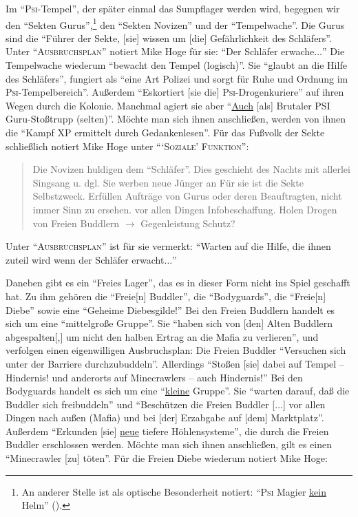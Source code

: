 \documentclass[a5paper,pagesize,numbers=noenddot]{scrbook}
\begin{document}
Im \enquote{\textsc{Psi}-Tempel}, der später einmal das Sumpflager werden wird, begegnen wir den \enquote{Sekten Gurus},\footnote{An anderer Stelle ist als optische Besonderheit notiert: \enquote{\textsc{Psi} Magier \uline{kein} Helm} (\autocite[S.~7]{orpheus_b_scribbles}).} den \enquote{Sekten Novizen} und der \enquote{Tempelwache}.
Die Gurus sind die \enquote{Führer der Sekte, [sie] wissen um [die] Gefährlichkeit des Schläfers}.
Unter \enquote{\textsc{Ausbruchsplan}} notiert Mike Hoge für sie: \enquote{Der Schläfer erwache$\ldots$}
Die Tempelwache wiederum \enquote{bewacht den Tempel (logisch)}.
Sie \enquote{glaubt an die Hilfe des Schläfers}, fungiert als \enquote{eine Art Polizei und sorgt für Ruhe und Ordnung im \textsc{Psi}-Tempelbereich}.
Außerdem \enquote{Eskortiert [sie die] \textsc{Psi}-Drogenkuriere} auf ihren Wegen durch die Kolonie.
Manchmal agiert sie aber \enquote{\uline{Auch} [als] Brutaler \textsc{PSI} Guru-Stoßtrupp (selten)}.
Möchte man sich ihnen anschließen, werden von ihnen die \enquote{Kampf XP ermittelt durch Gedankenlesen}.
Für das Fußvolk der Sekte schließlich notiert Mike Hoge unter \enquote{\enquote{\textsc{Soziale}} \textsc{Funktion}}:

\begin{quote}
   Die Novizen huldigen dem \enquote{Schläfer}.
   Dies geschieht des Nachts mit allerlei Singsang u. dgl.
   Sie werben neue Jünger an
   Für sie ist die Sekte Selbstzweck.
   Erfüllen Aufträge von Gurus oder deren Beauftragten, nicht immer Sinn zu ersehen.
   vor allen Dingen Infobeschaffung.
   Holen Drogen von Freien Buddlern $\rightarrow$ Gegenleistung Schutz?
\end{quote}

Unter \enquote{\textsc{Ausbruchsplan}} ist für sie vermerkt:
\enquote{Warten auf die Hilfe, die ihnen zuteil wird wenn der Schläfer erwacht$\ldots$}

Daneben gibt es ein \enquote{Freies Lager}, das es in dieser Form nicht ins Spiel geschafft hat.
Zu ihm gehören die \enquote{Freie[n] Buddler}, die \enquote{Bodyguards}, die \enquote{Freie[n] Diebe} sowie eine \enquote{Geheime Diebesgilde!}
Bei den Freien Buddlern handelt es sich um eine \enquote{mittelgroße Gruppe}.
Sie \enquote{haben sich von [den] Alten Buddlern abgespalten[,] um nicht den halben Ertrag an die Mafia zu verlieren}, und verfolgen einen eigenwilligen Ausbruchsplan:
Die Freien Buddler \enquote{Versuchen sich unter der Barriere durchzubuddeln}.
Allerdings \enquote{Stoßen [sie] dabei auf Tempel -- Hindernis! und anderorts auf Minecrawlers -- auch Hindernis!}
Bei den Bodyguards handelt es sich um eine \enquote{\uline{kleine} Gruppe}.
Sie \enquote{warten darauf, daß die Buddler sich freibuddeln} und \enquote{Beschützen die Freien Buddler [$\ldots$] vor allen Dingen nach außen (Mafia) und bei [der] Erzabgabe auf [dem] Marktplatz}.
Außerdem \enquote{Erkunden [sie] \uline{neue} tiefere Höhlensysteme}, die durch die Freien Buddler erschlossen werden.
Möchte man sich ihnen anschließen, gilt es einen \enquote{Minecrawler [zu] töten}.
Für die Freien Diebe wiederum notiert Mike Hoge:
\end{document}
